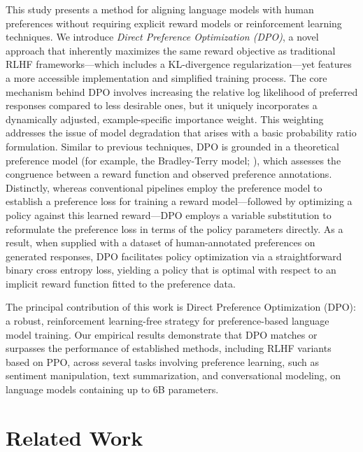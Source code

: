 This study presents a method for aligning language models with human preferences without requiring explicit reward models or reinforcement learning techniques. We introduce \textit{{Direct Preference Optimization} (DPO)}, a novel approach that inherently maximizes the same reward objective as traditional RLHF frameworks—which includes a KL-divergence regularization—yet features a more accessible implementation and simplified training process. The core mechanism behind DPO involves increasing the relative log likelihood of preferred responses compared to less desirable ones, but it uniquely incorporates a dynamically adjusted, example-specific importance weight. This weighting addresses the issue of model degradation that arises with a basic probability ratio formulation. Similar to previous techniques, DPO is grounded in a theoretical preference model (for example, the Bradley-Terry model; \cite{bradley1952rankanalysis}), which assesses the congruence between a reward function and observed preference annotations. Distinctly, whereas conventional pipelines employ the preference model to establish a preference loss for training a reward model—followed by optimizing a policy against this learned reward—DPO employs a variable substitution to reformulate the preference loss in terms of the policy parameters directly. As a result, when supplied with a dataset of human-annotated preferences on generated responses, DPO facilitates policy optimization via a straightforward binary cross entropy loss, yielding a policy that is optimal with respect to an implicit reward function fitted to the preference data.

The principal contribution of this work is Direct Preference Optimization (DPO): a robust, reinforcement learning-free strategy for preference-based language model training. Our empirical results demonstrate that DPO matches or surpasses the performance of established methods, including RLHF variants based on PPO, across several tasks involving preference learning, such as sentiment manipulation, text summarization, and conversational modeling, on language models containing up to 6B parameters.

\section{Related Work}

